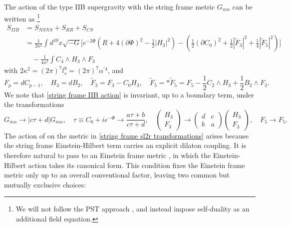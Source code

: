 The action of the type IIB supergravity \cite{Schwarz:1983qr,Howe:1983sra,Bergshoeff:1995as} with the string frame metric $G_{mn}$ can be written as 
\cite{Becker:2006dvp,ValeixoBento:2025emh}%
\footnote{
We will not follow the PST approach \cite{Pasti:1996vs,DallAgata:1997gnw,DallAgata:1998ahf}, and instead impose self-duality as an additional field equation.
}
\begin{equation}
\begin{aligned}
S_{IIB}
&=S_{NSNS} + S_{RR} + S_{CS}\\
&=\frac{1}{2\kappa^2}
\int d^{10}x \sqrt{-G}
\Bigg[
e^{-2\Phi}\left(R + 4(\partial\Phi)^2-\frac{1}{2}|H_3|^2\right)
-\left(\frac{1}{2}(\partial C_0)^2+\frac{1}{2}|\tilde F_3|^2+\frac{1}{4}|\tilde{F}_5|^2\right)
\Bigg]\\
&\quad -\frac{1}{4\kappa^2}\int C_4\wedge H_3\wedge F_3
\end{aligned}
\label{string frame IIB action}
\end{equation}
with $2\kappa^2=(2\pi)^7l_s^8=(2\pi)^7\alpha^{\prime 4}$, and
\begin{equation}
F_p = dC_{p-1}, \quad 
H_3 = dB_2, \quad
\tilde F_3 = F_3 - C_0 H_3,\quad
\tilde F_5 = * \tilde F_5 = F_5 - \frac12 C_2\wedge H_3 + \frac12 B_2\wedge F_3.
\end{equation}
We note that \eqref{string frame IIB action} is invariant, up to a boundary term, under the \SLR{} transformations
\begin{equation}
G_{mn}\to |c\tau+d|G_{mn},\quad
\tau\equiv C_0 + i e^{-\Phi} \to \frac{a\tau+b}{c\tau+d},\quad
\begin{pmatrix}
H_3\\F_3
\end{pmatrix}
\to
\begin{pmatrix}
d&c\\b&a
\end{pmatrix}
\begin{pmatrix}
H_3\\F_3
\end{pmatrix},\quad
F_5 \to F_5.
\label{string frame sl2r transformations}
\end{equation}
The action of \SLR{} on the metric in \eqref{string frame sl2r transformations} arises because the string frame Einstein-Hilbert term carries an explicit dilaton coupling.
It is therefore natural to pass to an Einstein frame metric \cite{Becker:2006dvp,Weigand:2018rez}, in which the Einstein-Hilbert action takes its canonical form.
This condition fixes the Einstein frame metric only up to an overall conventional factor, leaving two common but mutually exclusive choices:
